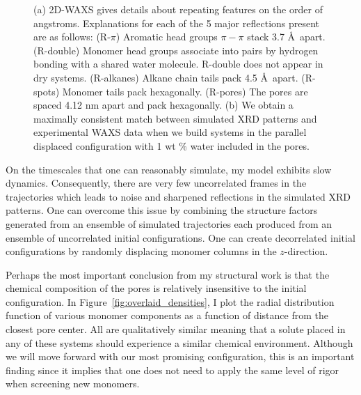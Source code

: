 \documentclass{article}
\begin{document}
\begin{figure}
\begin{subfigure}{0.49\linewidth}
	\end{subfigure}
    \caption{(a) 2D-WAXS gives details about repeating features on the order of
    angstroms. Explanations for each of the 5 major reflections present are
    as follows: (R-$\pi$) Aromatic head groups $\pi-\pi$ stack 3.7 \AA~apart. 
    (R-double) Monomer head groups associate into pairs by hydrogen bonding with
    a shared water molecule. R-double does not appear in dry systems. 
    (R-alkanes) Alkane chain tails pack 4.5 \AA~apart. (R-spots) Monomer tails
    pack hexagonally. (R-pores) The pores are spaced 4.12 nm apart and pack 
    hexagonally. (b) We obtain a maximally consistent match between simulated
    XRD patterns and experimental WAXS data when we build systems in the 
    parallel displaced configuration with 1 wt \% water included in the pores.
    }\label{fig:WAXS_comparison}
    \vspace{-0.75cm}
 \end{figure}
 
  On the timescales that one can reasonably simulate, my model exhibits slow 
  dynamics. Consequently, there are very few uncorrelated frames in the 
  trajectories which leads to noise and sharpened reflections in the simulated
  XRD patterns. One can overcome this issue by combining the structure factors
  generated from an ensemble of simulated trajectories each produced
  from an ensemble of uncorrelated initial configurations. One can create 
  decorrelated initial configurations by randomly displacing monomer columns in
  the $z$-direction.
 
  Perhaps the most important conclusion from my structural work is that the 
  chemical composition of the pores is relatively insensitive to the initial 
  configuration. In Figure~\ref{fig:overlaid_densities}, I plot the radial 
  distribution function of various monomer components as a function of distance
  from the closest pore center. All are qualitatively similar meaning that a 
  solute placed in any of these systems should experience a similar chemical 
  environment. Although we will move forward with our most promising 
  configuration, this is an important finding since it implies that one does
  not need to apply the same level of rigor when screening new monomers.
  
\end{document}
